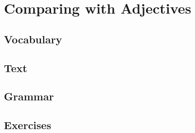 \chapter{Comparing with Adjectives}
\section*{Vocabulary}
\section*{Text}
\section*{Grammar}
\section*{Exercises}
